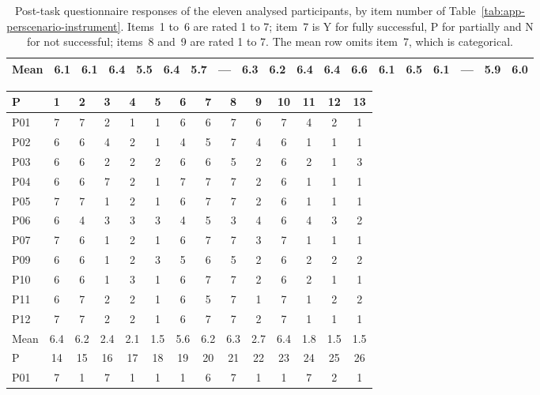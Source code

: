 \begin{table}[htpb]
\begin{tabular}{l*{6}{c}ccc@{\hskip 1.2em}*{6}{c}ccc}
        \midrule
        Mean & 6.1 & 6.1 & 6.4 & 5.5 & 6.4 & 5.7 & --- & 6.3 & 6.2 & 6.4 & 6.4 & 6.6 & 6.1 & 6.5 & 6.1 & --- & 5.9 & 6.0 \\
        \bottomrule
    \end{tabular}
    \caption{Post-task questionnaire responses of the eleven analysed participants, by item number of Table~\ref{tab:app-perscenario-instrument}. Items~1 to~6 are rated 1 to 7; item~7 is Y for fully successful, P for partially and N for not successful; items~8 and~9 are rated 1 to 7. The mean row omits item~7, which is categorical.}
    \label{tab:app-perscenario-responses}
\end{table}

\begin{table}[htpb]
    \centering
    \footnotesize
    \setlength{\tabcolsep}{3pt}
    \begin{tabular}{l*{13}{c}}
        \toprule
        P & 1 & 2 & 3 & 4 & 5 & 6 & 7 & 8 & 9 & 10 & 11 & 12 & 13 \\
        \midrule
        P01 & 7 & 7 & 2 & 1 & 1 & 6 & 6 & 7 & 6 & 7 & 4 & 2 & 1 \\
        P02 & 6 & 6 & 4 & 2 & 1 & 4 & 5 & 7 & 4 & 6 & 1 & 1 & 1 \\
        P03 & 6 & 6 & 2 & 2 & 2 & 6 & 6 & 5 & 2 & 6 & 2 & 1 & 3 \\
        P04 & 6 & 6 & 7 & 2 & 1 & 7 & 7 & 7 & 2 & 6 & 1 & 1 & 1 \\
        P05 & 7 & 7 & 1 & 2 & 1 & 6 & 7 & 7 & 2 & 6 & 1 & 1 & 1 \\
        P06 & 6 & 4 & 3 & 3 & 3 & 4 & 5 & 3 & 4 & 6 & 4 & 3 & 2 \\
        P07 & 7 & 6 & 1 & 2 & 1 & 6 & 7 & 7 & 3 & 7 & 1 & 1 & 1 \\
        P09 & 6 & 6 & 1 & 2 & 3 & 5 & 6 & 5 & 2 & 6 & 2 & 2 & 2 \\
        P10 & 6 & 6 & 1 & 3 & 1 & 6 & 7 & 7 & 2 & 6 & 2 & 1 & 1 \\
        P11 & 6 & 7 & 2 & 2 & 1 & 6 & 5 & 7 & 1 & 7 & 1 & 2 & 2 \\
        P12 & 7 & 7 & 2 & 2 & 1 & 6 & 7 & 7 & 2 & 7 & 1 & 1 & 1 \\
        \cmidrule(lr){1-14}
        Mean & 6.4 & 6.2 & 2.4 & 2.1 & 1.5 & 5.6 & 6.2 & 6.3 & 2.7 & 6.4 & 1.8 & 1.5 & 1.5 \\
        \midrule
        P & 14 & 15 & 16 & 17 & 18 & 19 & 20 & 21 & 22 & 23 & 24 & 25 & 26 \\
        \midrule
        P01 & 7 & 1 & 7 & 1 & 1 & 1 & 6 & 7 & 1 & 1 & 7 & 2 & 1 \\

\end{tabular}
\end{table}
